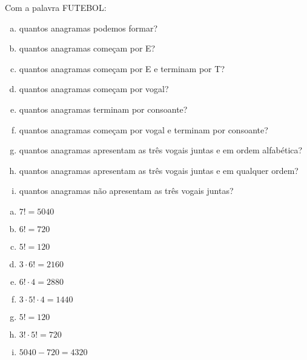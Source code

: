 \begin{ex}
Com a palavra FUTEBOL:
   \begin{enumerate}[(a)]
   \item quantos anagramas podemos formar?
   \item quantos anagramas começam por E?
   \item quantos anagramas começam por E e terminam por T?
   \item quantos anagramas começam por vogal?
   \item quantos anagramas terminam por consoante?
   \item quantos anagramas começam por vogal e terminam por consoante?
   \item quantos anagramas apresentam as três vogais juntas e em ordem alfabética?
   \item quantos anagramas apresentam as três vogais juntas e em qualquer ordem?
   \item quantos anagramas não apresentam as três vogais juntas?
   \end{enumerate}
     \begin{sol}
       \phantom{A}
         \begin{enumerate} [(a)]
             \item $7!=5040$
             \item $6!=720$
             \item $5!=120$
             \item $3\cdot6!=2160$
             \item $6!\cdot4=2880$
             \item $3\cdot5!\cdot4=1440$
             \item $5!=120$
             \item $3!\cdot5!=720$
             \item $5040-720=4320$
             
         \end{enumerate}
     \end{sol}
\end{ex}